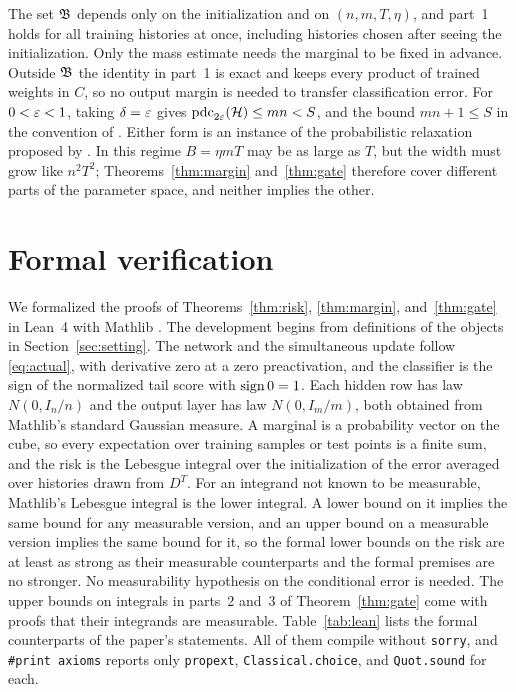\documentclass[11pt,letterpaper,pmlr,twoside]{jmlr}
\newcommand{\pdc}{\operatorname{pdc}}\newcommand{\sq}{\operatorname{sq}}
\newcommand{\lean}[1]{\texttt{#1}}
\begin{document}
The set $\mathfrak B$ depends only on the initialization and on $(n,m,T,\eta)$, and part~1 holds for all training histories at once, including histories chosen after seeing the initialization. Only the mass estimate needs the marginal to be fixed in advance. Outside $\mathfrak B$ the identity in part~1 is exact and keeps every product of trained weights in $C$, so no output margin is needed to transfer classification error. For $0<\varepsilon<1$, taking $\delta=\varepsilon$ gives $\pdc_{2\eps}(\Hc)\le mn<S$, and the bound $mn+1\le S$ in the convention of \citet{KMS20}. Either form is an instance of the probabilistic relaxation proposed by \citet[Section~4]{FKS26}. In this regime $B=\eta mT$ may be as large as $T$, but the width must grow like $n^2T^2$; Theorems~\ref{thm:margin} and~\ref{thm:gate} therefore cover different parts of the parameter space, and neither implies the other.

\section{Formal verification}
\label{sec:lean}
We formalized the proofs of Theorems~\ref{thm:risk}, \ref{thm:margin}, and~\ref{thm:gate} in Lean~4 \citep{Lean4} with Mathlib \citep{Mathlib}. The development begins from definitions of the objects in Section~\ref{sec:setting}. The network and the simultaneous update follow \eqref{eq:actual}, with derivative zero at a zero preactivation, and the classifier is the sign of the normalized tail score with $\operatorname{sign}0=1$. Each hidden row has law $N(0,I_n/n)$ and the output layer has law $N(0,I_m/m)$, both obtained from Mathlib's standard Gaussian measure. A marginal is a probability vector on the cube, so every expectation over training samples or test points is a finite sum, and the risk is the Lebesgue integral over the initialization of the error averaged over histories drawn from $D^T$. For an integrand not known to be measurable, Mathlib's Lebesgue integral is the lower integral. A lower bound on it implies the same bound for any measurable version, and an upper bound on a measurable version implies the same bound for it, so the formal lower bounds on the risk are at least as strong as their measurable counterparts and the formal premises are no stronger. No measurability hypothesis on the conditional error is needed. The upper bounds on integrals in parts~2 and~3 of Theorem~\ref{thm:gate} come with proofs that their integrands are measurable. Table~\ref{tab:lean} lists the formal counterparts of the paper's statements. All of them compile without \lean{sorry}, and \lean{\#print axioms} reports only \lean{propext}, \lean{Classical.choice}, and \lean{Quot.sound} for each.
\end{document}
